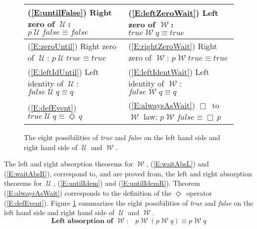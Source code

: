 \documentclass[12pt, fleqn, leqno]{article}
\newcommand{\Until}{\;\mathcal{U}\;}
\newcommand{\Wait}{\;\mathcal{W}\;}
\newcommand{\Event}{\Diamond\,}
\newcommand{\Always}{\Box\,}
\begin{document}
\begin{figure}[t]
\centering
\renewcommand\arraystretch{1.2}
\begin{tabular}{ l l }
  \toprule
  (\ref{E:untilFalse}) Right zero of $\Until$:\; $p \Until \mathit{false} \equiv \mathit{false}$
  &
  (\ref{E:leftZeroWait}) Left zero of $\Wait$:\; $\mathit{true} \Wait q \equiv \mathit{true}$ \\
  \midrule
  (\ref{E:zeroUntil}) Right zero of $\Until$:\; $p \Until \mathit{true} \equiv \mathit{true}$
  &
  (\ref{E:rightZeroWait}) Right zero of $\Wait$:\; $p \Wait \mathit{true} \equiv \mathit{true}$ \\
  \midrule
  (\ref{E:leftIdUntil}) Left identity of $\Until$:\; $\mathit{false} \Until q \equiv q$
  &
  (\ref{E:leftIdentWait}) Left identity of $\Wait$:\; $\mathit{false} \Wait q \equiv q$ \\
  \midrule
  (\ref{E:defEvent}) $\mathit{true} \Until q \equiv \Event q$
  &
  (\ref{E:alwaysAsWait}) $\Always$ to $\Wait$ law:\; $p \Wait \mathit{false}\equiv \Always p$ \\
  \bottomrule
\end{tabular}
\renewcommand\arraystretch{1}
\caption{The eight possibilities of \textit{true} and \textit{false} on the left hand side and right hand side of $\Until$ and $\Wait$.
\label{true-false-wait-until}}
\end{figure}
The left and right absorption theorems for $\Wait$, (\ref{E:waitAbsL}) and (\ref{E:waitAbsR}), correspond to, and are proved from, the left and right absorption theorems for $\Until$, (\ref{E:untilIdem}) and (\ref{E:untilIdemR}).
Theorem (\ref{E:alwaysAsWait}) corresponds to the definition of the $\Event$ operator (\ref{E:defEvent}).
Figure \ref{true-false-wait-until} summarizes the eight possibilities of \textit{true} and \textit{false} on the left hand side and right hand side of $\Until$ and $\Wait$.
\begin{equation}\label{E:waitAbsL}
\textbf{Left absorption of $\Wait$:}\quad p \Wait (p \Wait q) \equiv p \Wait q
\end{equation}
\end{document}
